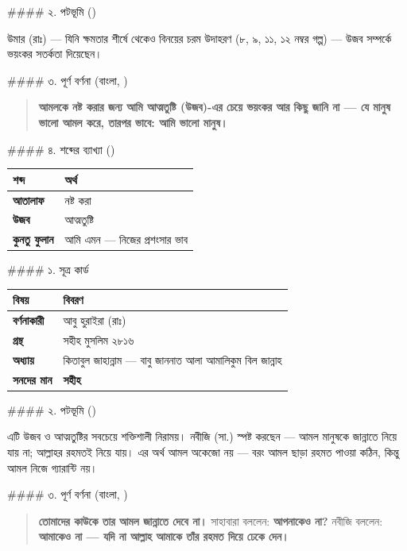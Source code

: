 \#\#\#\# ২. পটভূমি ()

উমার (রাঃ) — যিনি ক্ষমতার শীর্ষে থেকেও বিনয়ের চরম উদাহরণ (৮, ৯, ১১, ১২ নম্বর গল্প) — উজব সম্পর্কে ভয়ংকর সতর্কতা দিয়েছেন।

\#\#\#\# ৩. পূর্ণ বর্ণনা (বাংলা, )

\begin{quote}
\textbf{আমলকে নষ্ট করার জন্য আমি আত্মতুষ্টি (উজব)-এর চেয়ে ভয়ংকর আর কিছু জানি না — যে মানুষ ভালো আমল করে, তারপর ভাবে: আমি ভালো মানুষ।}
\end{quote}

\#\#\#\# ৪. শব্দের ব্যাখ্যা ()

\begin{table}[h]\centering\small
\begin{tabular}{ll}
শব্দ & অর্থ \\
\hline
\textbf{আতালাফ} & নষ্ট করা \\
\textbf{উজব} & আত্মতুষ্টি \\
\textbf{কুনতু ফুলান} & আমি এমন — নিজের প্রশংসার ভাব \\
\hline
\end{tabular}
\end{table}

\#\#\#\# ১. সূত্র কার্ড

\begin{table}[h]\centering\small
\begin{tabular}{ll}
বিষয় & বিবরণ \\
\hline
\textbf{বর্ণনাকারী} & আবু হুরাইরা (রাঃ) \\
\textbf{গ্রন্থ} & সহীহ মুসলিম ২৮১৬ \\
\textbf{অধ্যায়} & কিতাবুল জাহান্নাম — বাবু জাননাত আলা আমালিকুম বিল জান্নাহ \\
\textbf{সনদের মান} & \textbf{সহীহ} \\
\hline
\end{tabular}
\end{table}

\#\#\#\# ২. পটভূমি ()

এটি উজব ও আত্মতুষ্টির সবচেয়ে শক্তিশালী নিরাময়। নবীজি (সা.) স্পষ্ট করছেন — আমল মানুষকে জান্নাতে নিয়ে যায় না; আল্লাহর রহমতই নিয়ে যায়। এর অর্থ আমল অকেজো নয় — বরং আমল ছাড়া রহমত পাওয়া কঠিন, কিন্তু আমল নিজে গ্যারান্টি নয়।

\#\#\#\# ৩. পূর্ণ বর্ণনা (বাংলা, )

\begin{quote}
\textbf{তোমাদের কাউকে তার আমল জান্নাতে দেবে না।} সাহাবারা বললেন: \textbf{আপনাকেও না?} নবীজি বললেন: \textbf{আমাকেও না — যদি না আল্লাহ আমাকে তাঁর রহমত দিয়ে ঢেকে দেন।}
\end{quote}

